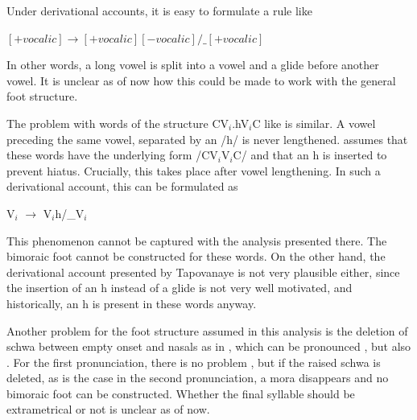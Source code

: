 Under derivational accounts, it is easy to formulate a rule like
% 

\ea $[+vocalic]$\textipa{:}$ \to [+vocalic][-vocalic]/\_[+vocalic]$\z

In other words, a long vowel is split into a vowel and a glide before another vowel. It is unclear as of now how this could be made to work with the general foot structure.

The problem with words of the structure CV$_i$.hV$_i$C	like  is similar. A vowel preceding the same vowel, separated by an /h/ is never lengthened. \citet{Tapovanaye1995} assumes that these words have the underlying form /CV$_i$V$_i$C/ and that an h is inserted to prevent hiatus. Crucially, this takes place after vowel lengthening. In such a derivational account, this can be formulated as

\ea V$_i$\textipa{:} $\to$ V$_i$h/\_V$_i$\z

This phenomenon cannot be captured with the analysis presented there. The bimoraic foot cannot be constructed for these words. On the other hand, the derivational account presented by Tapovanaye is not very plausible either, since the insertion of an h instead of a glide is not very well motivated, and historically, an h is present in these words anyway. 

Another problem for the foot structure assumed in this analysis is the deletion of schwa between empty onset and nasals as in , which can be pronounced , but also . For the first pronunciation, there is no problem , but if the raised schwa is deleted, as is the case in the second pronunciation, a mora disappears and no bimoraic foot can be constructed. Whether the final syllable should be extrametrical  or not  is unclear as of now.



